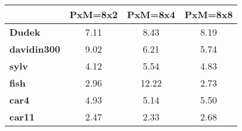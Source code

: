 \begin{tabular}{|l|c|c|c|}
\hline
&\textbf{PxM=8x2}&\textbf{PxM=8x4}&\textbf{PxM=8x8}\\\hline
\textbf{Dudek}&7.11&8.43&8.19\\\hline
\textbf{davidin300}&9.02&6.21&5.74\\\hline
\textbf{sylv}&4.12&5.54&4.83\\\hline
\textbf{fish}&2.96&12.22&2.73\\\hline
\textbf{car4}&4.93&5.14&5.50\\\hline
\textbf{car11}&2.47&2.33&2.68\\\hline
\end{tabular}
